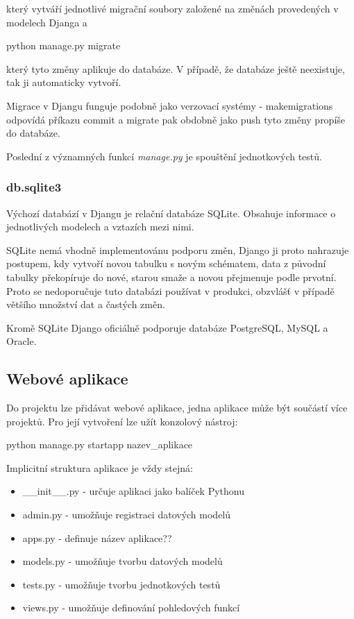 který vytváří jednotlivé migrační soubory založené na změnách
provedených v modelech Djanga a

\begin{center}
\textsf{python manage.py migrate}
\end{center}

který tyto změny aplikuje do databáze. V případě, že databáze ještě
neexistuje, tak ji automaticky vytvoří.

Migrace v Djangu funguje podobně jako verzovací systémy -
\textsf{makemigrations} odpovídá příkazu \textsf{commit} a
\textsf{migrate} pak obdobně jako \textsf{push} tyto změny propíše do
databáze.

Poslední z významných funkcí \textit{manage.py} je spouštění
jednotkových testů.

\subsubsection{db.sqlite3}
Výchozí databází v Djangu je relační databáze SQLite. Obsahuje
informace o jednotlivých modelech a vztazích mezi nimi.

SQLite nemá vhodně implementovánu podporu změn, Django ji proto
nahrazuje postupem, kdy vytvoří novou tabulku s novým schématem, data
z původní tabulky překopíruje do nové, starou smaže a novou přejmenuje
podle prvotní. Proto se nedoporučuje tuto databázi používat v
produkci, obzvlášť v případě většího množství dat a častých změn.

Kromě SQLite Django oficiálně podporuje databáze PostgreSQL, MySQL a
Oracle.

\subsection{Webové aplikace}
\label{django-app}
Do projektu lze přidávat webové aplikace, jedna aplikace může být
součástí více projektů. Pro její vytvoření lze užít konzolový nástroj:

\begin{center}
\textsf{python manage.py startapp nazev\_aplikace}
\end{center}

Implicitní struktura aplikace je vždy stejná:

\begin{itemize}
\item \textsf{\_\_init\_\_.py} - určuje aplikaci jako balíček Pythonu
\item \textsf{admin.py} - umožňuje registraci datových modelů
\item \textsf{apps.py} - definuje název aplikace??
\item \textsf{models.py} - umožňuje tvorbu datových modelů
\item \textsf{tests.py} - umožňuje tvorbu jednotkových testů
\item \textsf{views.py} - umožňuje definování pohledových funkcí
\end{itemize}

